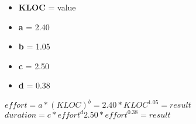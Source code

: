 \begin{itemize}
	\item \textbf{KLOC} = value
	\item \textbf{a} = 2.40
	\item \textbf{b} = 1.05
	\item \textbf{c} = 2.50
	\item \textbf{d} = 0.38
\end{itemize}

\begin{center}
$ effort = a * (KLOC)^{b} = 2.40 * KLOC^{1.05} = result $\\
$ duration = c * effort^{d} 2.50 * effort ^{0.38} = result $\\
\end{center}

